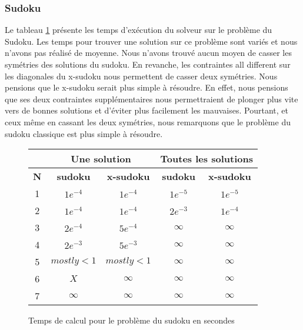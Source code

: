 \FloatBarrier

\subsubsection{Sudoku}

Le tableau \ref{Tab-Temps-Sudoku} présente les temps d'exécution du solveur sur le problème du Sudoku. Les temps pour trouver une solution sur ce problème sont variés et nous n'avons pas réalisé de moyenne. Nous n'avons trouvé aucun moyen de casser les symétries des solutions du sudoku. En revanche, les contraintes all different sur les diagonales du x-sudoku nous permettent de casser deux symétries. Nous pensions que le x-sudoku serait plus simple à résoudre. En effet, nous pensions que ses deux contraintes supplémentaires nous permettraient de plonger plus vite vers de bonnes solutions et d'éviter plus facilement les mauvaises. Pourtant, et ceux même en cassant les deux symétries, nous remarquons que le problème du sudoku classique est plus simple à résoudre.

\begin{figure}[!h]
    \begin{center}
        \begin{tabular}{|c|c|c|c|c|}
            \hline
            \textbf{} & \multicolumn{2}{c|}{\textbf{Une solution}} & \multicolumn{2}{c|}{\textbf{Toutes les solutions}}  \\ \hline
            \textbf{N} & \textbf{sudoku} & \textbf{x-sudoku} & \textbf{sudoku} & \textbf{x-sudoku} \\ \hline
            1 & $1e^{-4}$ & $1e^{-4}$ & $1e^{-5}$ & $1e^{-5}$ \\ \hline
            2 & $1e^{-4}$ & $1e^{-4}$ & $2e^{-3}$ & $1e^{-4}$ \\ \hline
            3 & $2e^{-4}$ & $5e^{-4}$ & $\infty$ & $\infty$ \\ \hline
            4 & $2e^{-3}$ & $5e^{-3}$ & $\infty$ & $\infty$ \\ \hline
            5 & $mostly<1$ & $mostly<1$ & $\infty$ & $\infty$ \\ \hline
            6 & $X$ & $\infty$ & $\infty$ & $\infty$ \\ \hline
            7 & $\infty$ & $\infty$ & $\infty$ & $\infty$ \\ \hline
        \end{tabular}
        \caption{Temps de calcul pour le problème du sudoku en secondes}
        \label{Tab-Temps-Sudoku}
    \end{center}
\end{figure}
